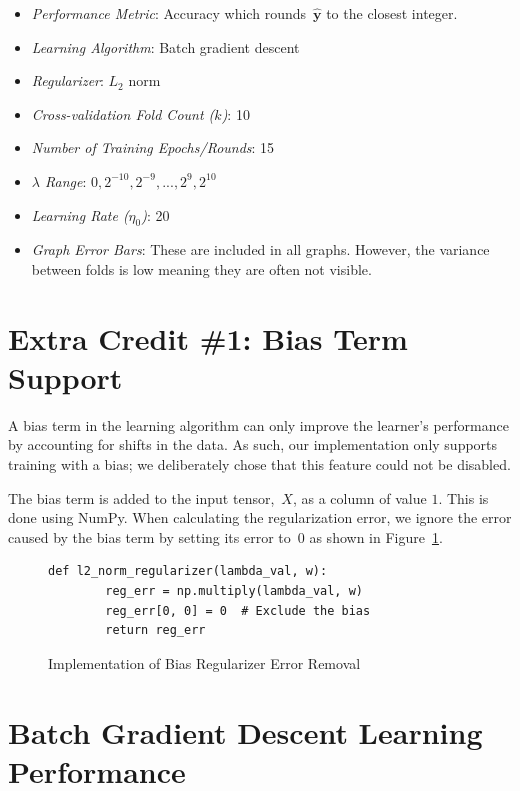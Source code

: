 \documentclass{report}
\newcommand{\yhat}{\hat{\mathbf{y}}}
\begin{document}
  \begin{itemize}
    \item \textit{Performance Metric}: Accuracy which rounds~$\yhat$ to the closest integer.
    \item \textit{Learning Algorithm}: Batch gradient descent
    \item \textit{Regularizer}: $L_2$ norm
    \item \textit{Cross-validation Fold Count ($k$)}: 10
    \item \textit{Number of Training Epochs/Rounds}: 15
    \item \textit{$\lambda$ Range}: $0,2^{-10},2^{-9},...,2^{9},2^{10}$
    \item \textit{Learning Rate ($\eta_0$)}: 20
    \item \textit{Graph Error Bars}: These are included in all graphs.  However, the variance between folds is low meaning they are often not visible.
  \end{itemize}

  \section{Extra Credit \#1: Bias Term Support}
  
  A bias term in the learning algorithm can only improve the learner's performance by accounting for shifts in the data.  As such, our implementation only supports training with a bias; we deliberately chose that this feature could not be disabled.  
  
  The bias term is added to the input tensor,~$X$, as a column of value $1$.  This is done using NumPy.  When calculating the regularization error, we ignore the error caused by the bias term by setting its error to~$0$ as shown in Figure~\ref{fig:codeBiasRegularizerRemoval}.
  
  \begin{figure}[tb]
    \begin{lstlisting}[frame=single] 
      def l2_norm_regularizer(lambda_val, w):
        reg_err = np.multiply(lambda_val, w)
        reg_err[0, 0] = 0  # Exclude the bias
        return reg_err
    \end{lstlisting}
    \caption{Implementation of Bias Regularizer Error Removal}\label{fig:codeBiasRegularizerRemoval}
  \end{figure}

  \section{Batch Gradient Descent Learning Performance}
  
\end{document}

